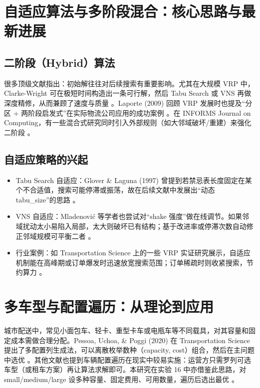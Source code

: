 \documentclass[12pt,a4paper,twoside]{ctexbook}
\begin{document}
\section{自适应算法与多阶段混合：核心思路与最新进展}
\subsection{二阶段（Hybrid）算法}
很多顶级文献指出：初始解往往对后续搜索有重要影响。尤其在大规模 VRP 中，Clarke-Wright 可在极短时间构造出一条可行解，然后 Tabu Search 或 VNS 再做深度精修，从而兼顾了速度与质量 \cite{2,4}。Laporte (2009) 回顾 VRP 发展时也提及“分区 + 两阶段启发式”在实际物流公司应用的成功案例 \cite{14}。在 INFORMS Journal on Computing，有一些混合式研究同时引入外部规则（如大邻域破坏/重建）来强化二阶段 \cite{9}。

\subsection{自适应策略的兴起}
\begin{itemize}
    \item Tabu Search 自适应：Glover \& Laguna (1997) 曾提到若禁忌表长度固定在某个不合适值，搜索可能停滞或振荡，故在后续文献中发展出“动态 tabu\_size”的思路 \cite{8}。
    \item VNS 自适应：Mladenović 等学者也尝试对“shake 强度”做在线调节。如果邻域扰动太小易陷入局部，太大则破坏已有结构；基于改进率或停滞次数自动修正邻域规模可平衡二者 \cite{5,9,10}。
    \item 行业案例：如 Transportation Science 上的一些 VRP 实证研究展示，自适应机制能在高峰期或订单爆发时迅速放宽搜索范围；订单稀疏时则收紧搜索，节约算力 \cite{8}。
\end{itemize}

\section{多车型与配置遍历：从理论到应用}
城市配送中，常见小面包车、轻卡、重型卡车或电瓶车等不同载具，对其容量和固定成本需做合理分配。Pessoa, Uchoa, \& Poggi (2020) 在 Transportation Science 提出了多配置列生成法，可以离散枚举数种（capacity, cost）组合，然后在主问题中选优 \cite{15}。其他文献也提到车辆配置遍历在现实中较易实施：运营方只需罗列可选车型（或租车方案）再让算法求解即可。本研究在实验 16 中亦借鉴此思路，对 small/medium/large 设多种容量、固定费用、可用数量，遍历后选出最优 \cite{7}。
\end{document}
